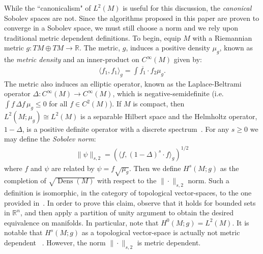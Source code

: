 \documentclass[final,leqno]{siamart}
\DeclareMathOperator{\Dens}{Dens}
\begin{document}
While the ``canonicalism" of $L^{2}(M)$ is useful for this discussion, the \emph{canonical} Sobolev spaces are not.
Since the algorithms proposed in this paper are proven to converge in a Sobolev space, we must still choose a norm and we rely upon traditional metric dependent definitions.  
To begin, equip $M$ with a Riemannian metric $g:TM \oplus TM \to \mathbb{R}$.
The metric, $g$, induces a positive density $\mu_g$, known as the \emph{metric density} and an inner-product on $C^\infty(M)$
given by:
\begin{align*}
	\langle f_1 , f_1 \rangle_{g} = \int \overline{f_1} \cdot f_2 \mu_g.
\end{align*}
The metric also induces an elliptic operator, known as the Laplace-Beltrami operator $\Delta: C^{\infty}(M) \to C^{\infty}(M)$, which is negative-semidefinite (i.e. $\int f \, \Delta f \, \mu_{g} \leq 0$ for all $f \in C^{2}(M)$).
If $M$ is compact, then $L^2(M ; \mu_g) \cong L^2(M)$ is a separable Hilbert space and the Helmholtz operator, $1 - \Delta$, is a positive definite operator with a discrete spectrum~\cite{Taylor1974}.
For any $s \geq 0$ we may define the \emph{Sobolev norm}:
\begin{align*}
	\| \psi \|_{s,2} =  \left( \langle f , (1-\Delta)^s \cdot  f \rangle_{g} \right)^{1/2}
\end{align*}
where $f$ and $\psi$ are related by $\psi = f \sqrt{\mu_{g}}$.
Then  we define $H^s(M ;g)$ as the completion of $\sqrt{\Dens(M)}$ with respect to the $\| \cdot \|_{s,2}$ norm.  
Such a definition is isomorphic, in the category of topological vector-spaces, to the one provided in~\cite{Hebey1999}.
In order to prove this claim, observe that it holds for bounded sets in $\mathbb{R}^{n}$, and then apply a partition of unity argument to obtain the desired equivalence on manifolds.
In particular, note that $H^0(M;g) = L^2(M)$.  It is notable that $H^{s}(M;g)$ as a topological vector-space is actually not metric dependent ~\cite[Proposition 2.2]{Hebey1999}.
However, the norm $\| \cdot \|_{s,2}$ is metric dependent.
\end{document}
